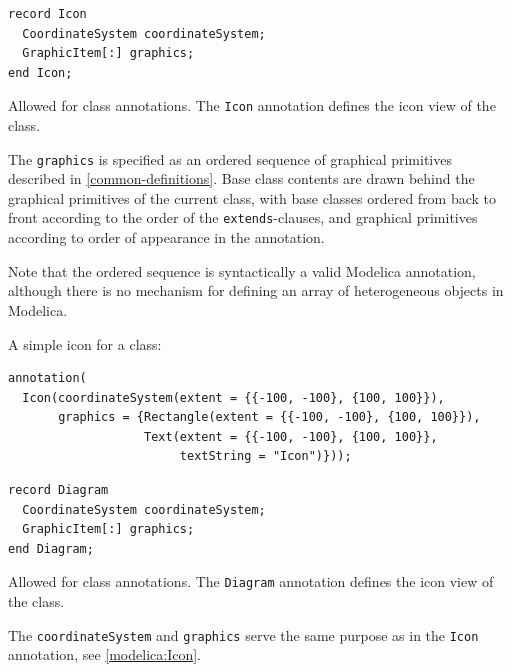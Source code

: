 \begin{annotationdefinition}[Icon]
\begin{synopsis}\begin{lstlisting}
record Icon
  CoordinateSystem coordinateSystem;
  GraphicItem[:] graphics;
end Icon;
\end{lstlisting}\end{synopsis}
\begin{semantics}
Allowed for class annotations.
The \lstinline{Icon} annotation defines the icon view of the class.

The \lstinline!graphics! is specified as an ordered sequence of graphical primitives described in \cref{common-definitions}.
Base class contents are drawn behind the graphical primitives of the current class, with base classes ordered from back to front according to the order of the \lstinline!extends!-clauses, and graphical primitives according to order of appearance in the annotation.

\begin{nonnormative}
Note that the ordered sequence is syntactically a valid Modelica annotation, although there is no mechanism for defining an array of heterogeneous objects in Modelica.
\end{nonnormative}

\begin{example}
A simple icon for a class:
\begin{lstlisting}[language=modelica]
annotation(
  Icon(coordinateSystem(extent = {{-100, -100}, {100, 100}}),
       graphics = {Rectangle(extent = {{-100, -100}, {100, 100}}),
                   Text(extent = {{-100, -100}, {100, 100}},
                        textString = "Icon")}));
\end{lstlisting}
\end{example}
\end{semantics}
\end{annotationdefinition}

\begin{annotationdefinition}[Diagram]
\begin{synopsis}\begin{lstlisting}
record Diagram
  CoordinateSystem coordinateSystem;
  GraphicItem[:] graphics;
end Diagram;
\end{lstlisting}\end{synopsis}
\begin{semantics}
Allowed for class annotations.
The \lstinline{Diagram} annotation defines the icon view of the class.

The \lstinline{coordinateSystem} and \lstinline{graphics} serve the same purpose as in the \lstinline!Icon! annotation, see \cref{modelica:Icon}.
\end{semantics}
\end{annotationdefinition}


